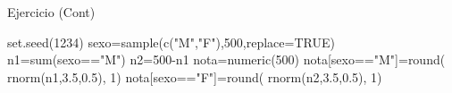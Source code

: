 \documentclass[
  ignorenonframetext,
  aspectratio=169,
  spanish,
]{beamer}
\newenvironment{Shaded}{\begin{snugshade}}{\end{snugshade}}
\newcommand{\AttributeTok}[1]{\textcolor[rgb]{0.40,0.45,0.13}{#1}}
\newcommand{\ConstantTok}[1]{\textcolor[rgb]{0.56,0.35,0.01}{#1}}
\newcommand{\DecValTok}[1]{\textcolor[rgb]{0.68,0.00,0.00}{#1}}
\newcommand{\FloatTok}[1]{\textcolor[rgb]{0.68,0.00,0.00}{#1}}
\newcommand{\FunctionTok}[1]{\textcolor[rgb]{0.28,0.35,0.67}{#1}}
\newcommand{\NormalTok}[1]{\textcolor[rgb]{0.00,0.23,0.31}{#1}}
\newcommand{\OtherTok}[1]{\textcolor[rgb]{0.00,0.23,0.31}{#1}}
\newcommand{\SpecialCharTok}[1]{\textcolor[rgb]{0.37,0.37,0.37}{#1}}
\newcommand{\StringTok}[1]{\textcolor[rgb]{0.13,0.47,0.30}{#1}}
\begin{document}
\begin{frame}[fragile]{Ejercicio (Cont)}
\label{ejercicio-cont}
\begin{Shaded}
\begin{Highlighting}[]
\FunctionTok{set.seed}\NormalTok{(}\DecValTok{1234}\NormalTok{)}
\NormalTok{sexo}\OtherTok{=}\FunctionTok{sample}\NormalTok{(}\FunctionTok{c}\NormalTok{(}\StringTok{"M"}\NormalTok{,}\StringTok{"F"}\NormalTok{),}\DecValTok{500}\NormalTok{,}\AttributeTok{replace=}\ConstantTok{TRUE}\NormalTok{)}
\NormalTok{n1}\OtherTok{=}\FunctionTok{sum}\NormalTok{(sexo}\SpecialCharTok{==}\StringTok{"M"}\NormalTok{)}
\NormalTok{n2}\OtherTok{=}\DecValTok{500}\SpecialCharTok{{-}}\NormalTok{n1}
\NormalTok{nota}\OtherTok{=}\FunctionTok{numeric}\NormalTok{(}\DecValTok{500}\NormalTok{)}
\NormalTok{nota[sexo}\SpecialCharTok{==}\StringTok{"M"}\NormalTok{]}\OtherTok{=}\FunctionTok{round}\NormalTok{( }\FunctionTok{rnorm}\NormalTok{(n1,}\FloatTok{3.5}\NormalTok{,}\FloatTok{0.5}\NormalTok{), }\DecValTok{1}\NormalTok{)}
\NormalTok{nota[sexo}\SpecialCharTok{==}\StringTok{"F"}\NormalTok{]}\OtherTok{=}\FunctionTok{round}\NormalTok{( }\FunctionTok{rnorm}\NormalTok{(n2,}\FloatTok{3.5}\NormalTok{,}\FloatTok{0.5}\NormalTok{), }\DecValTok{1}\NormalTok{) }
\end{Highlighting}
\end{Shaded}
\end{frame}
\end{document}
